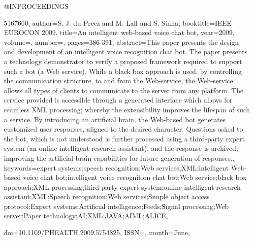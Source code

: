 @INPROCEEDINGS{5167660, 
author={S. J. du Preez and M. Lall and S. Sinha}, 
booktitle={IEEE EUROCON 2009}, 
title={An intelligent web-based voice chat bot}, 
year={2009}, 
volume={}, 
number={}, 
pages={386-391}, 
abstract={This paper presents the design and development of an intelligent voice recognition chat bot. The paper presents a technology demonstrator to verify a proposed framework required to support such a bot (a Web service). While a black box approach is used, by controlling the communication structure, to and from the Web-service, the Web-service allows all types of clients to communicate to the server from any platform. The service provided is accessible through a generated interface which allows for seamless XML processing; whereby the extensibility improves the lifespan of such a service. By introducing an artificial brain, the Web-based bot generates customized user responses, aligned to the desired character. Questions asked to the bot, which is not understood is further processed using a third-party expert system (an online intelligent research assistant), and the response is archived, improving the artificial brain capabilities for future generation of responses.}, 
keywords={expert systems;speech recognition;Web services;XML;intelligent Web-based voice chat bot;intelligent voice recognition chat bot;Web service;black box approach;XML processing;third-party expert system;online intelligent research assistant;XML;Speech recognition;Web services;Simple object access protocol;Expert systems;Artificial intelligence;Feeds;Signal processing;Web server;Paper technology;AI;XML;JAVA;AIML;ALICE}, 

doi={10.1109/PHEALTH.2009.5754825}, 
ISSN={}, 
month={June},}
